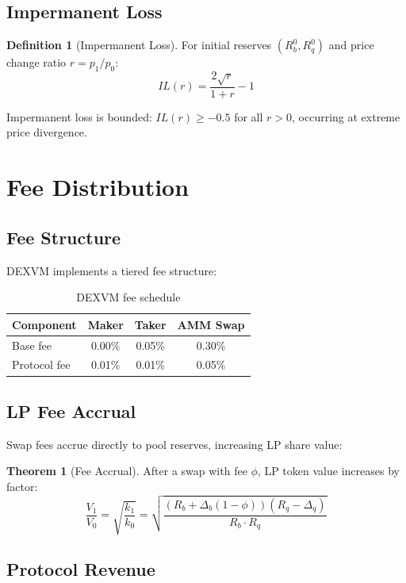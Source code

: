 \documentclass[11pt,a4paper]{article}
\theoremstyle{definition}
\newtheorem{definition}{Definition}
\newtheorem{theorem}{Theorem}
\begin{document}
\subsection{Impermanent Loss}

\begin{definition}[Impermanent Loss]
For initial reserves $(R_b^0, R_q^0)$ and price change ratio $r = p_1/p_0$:
\[
IL(r) = \frac{2\sqrt{r}}{1 + r} - 1
\]
\end{definition}

Impermanent loss is bounded: $IL(r) \geq -0.5$ for all $r > 0$, occurring at extreme price divergence.

\section{Fee Distribution}

\subsection{Fee Structure}

DEXVM implements a tiered fee structure:

\begin{table}[h]
\centering
\begin{tabular}{@{}lccc@{}}
\toprule
Component & Maker & Taker & AMM Swap \\
\midrule
Base fee & 0.00\% & 0.05\% & 0.30\% \\
Protocol fee & 0.01\% & 0.01\% & 0.05\% \\
\bottomrule
\end{tabular}
\caption{DEXVM fee schedule}
\end{table}

\subsection{LP Fee Accrual}

Swap fees accrue directly to pool reserves, increasing LP share value:

\begin{theorem}[Fee Accrual]
After a swap with fee $\phi$, LP token value increases by factor:
\[
\frac{V_1}{V_0} = \sqrt{\frac{k_1}{k_0}} = \sqrt{\frac{(R_b + \Delta_b(1-\phi))(R_q - \Delta_q)}{R_b \cdot R_q}}
\]
\end{theorem}

\subsection{Protocol Revenue}
\end{document}
